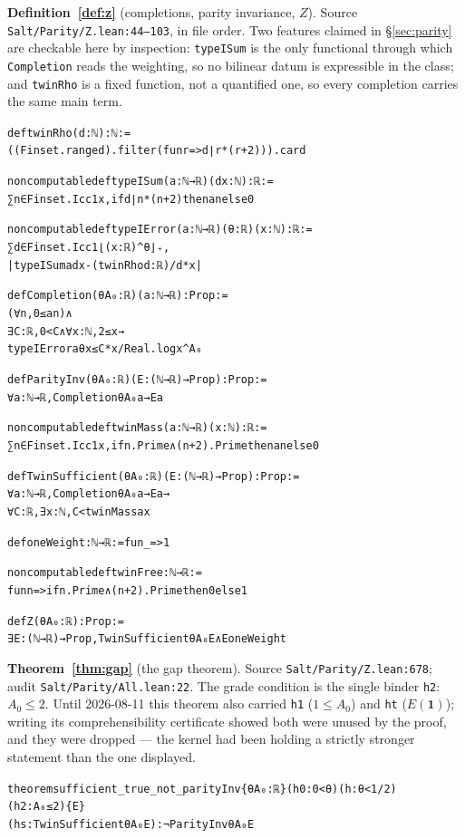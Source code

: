 \documentclass{CUP-JNL-FMP}
\newcommand{\leaninline}[1]{{\small\texttt{#1}}}
\theoremstyle{remark}
\begin{document}
\medskip\noindent\textbf{Definition~\ref{def:z}} (completions, parity invariance,
$Z$). Source \leaninline{Salt/Parity/Z.lean:44--103}, in file order. Two features
claimed in \S\ref{sec:parity} are checkable here by inspection:
\leaninline{typeISum} is the only functional through which
\leaninline{Completion} reads the weighting, so no bilinear datum is expressible
in the class; and \leaninline{twinRho} is a fixed function, not a quantified one,
so every completion carries the same main term.
{\footnotesize\begin{alltt}
def twinRho (d : ℕ) : ℕ :=
  ((Finset.range d).filter (fun r => d ∣ r * (r + 2))).card

noncomputable def typeISum (a : ℕ → ℝ) (d x : ℕ) : ℝ :=
  ∑ n ∈ Finset.Icc 1 x, if d ∣ n * (n + 2) then a n else 0

noncomputable def typeIError (a : ℕ → ℝ) (θ : ℝ) (x : ℕ) : ℝ :=
  ∑ d ∈ Finset.Icc 1 ⌊(x : ℝ) ^ θ⌋₊,
    |typeISum a d x - (twinRho d : ℝ) / d * x|

def Completion (θ A₀ : ℝ) (a : ℕ → ℝ) : Prop :=
  (∀ n, 0 ≤ a n) ∧
  ∃ C : ℝ, 0 < C ∧ ∀ x : ℕ, 2 ≤ x →
    typeIError a θ x ≤ C * x / Real.log x ^ A₀

def ParityInv (θ A₀ : ℝ) (E : (ℕ → ℝ) → Prop) : Prop :=
  ∀ a : ℕ → ℝ, Completion θ A₀ a → E a

noncomputable def twinMass (a : ℕ → ℝ) (x : ℕ) : ℝ :=
  ∑ n ∈ Finset.Icc 1 x, if n.Prime ∧ (n + 2).Prime then a n else 0

def TwinSufficient (θ A₀ : ℝ) (E : (ℕ → ℝ) → Prop) : Prop :=
  ∀ a : ℕ → ℝ, Completion θ A₀ a → E a →
    ∀ C : ℝ, ∃ x : ℕ, C < twinMass a x

def oneWeight : ℕ → ℝ := fun _ => 1

noncomputable def twinFree : ℕ → ℝ :=
  fun n => if n.Prime ∧ (n + 2).Prime then 0 else 1

def Z (θ A₀ : ℝ) : Prop :=
  ∃ E : (ℕ → ℝ) → Prop, TwinSufficient θ A₀ E ∧ E oneWeight
\end{alltt}}

\medskip\noindent\textbf{Theorem~\ref{thm:gap}} (the gap theorem). Source
\leaninline{Salt/Parity/Z.lean:678}; audit \leaninline{Salt/Parity/All.lean:22}.
The grade condition is the single binder \leaninline{h2}: $A_0 \le 2$. Until
2026-08-11 this theorem also carried \leaninline{h1} ($1 \le A_0$) and
\leaninline{ht} ($E(\mathbf{1})$); writing its comprehensibility certificate showed
both were unused by the proof, and they were dropped --- the kernel had been holding
a strictly stronger statement than the one displayed.
{\footnotesize\begin{alltt}
theorem sufficient_true_not_parityInv \{θ A₀ : ℝ\} (h0 : 0 < θ) (h : θ < 1 / 2)
    (h2 : A₀ ≤ 2) \{E\}
    (hs : TwinSufficient θ A₀ E) : ¬ ParityInv θ A₀ E
\end{alltt}}
\end{document}
